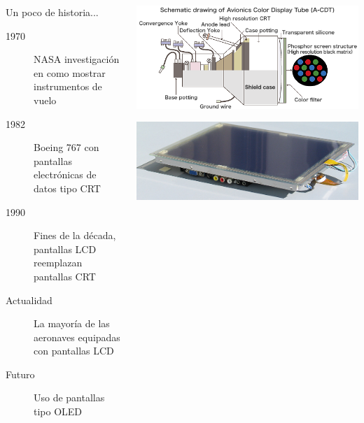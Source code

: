 

\begin{frame}
  \begin{columns}
    \begin{column}{0.5\textwidth}
      \begin{block}{Un poco de historia...}
{\normalsize
        \begin{description}
        \item[1970] NASA investigaci\'on en como mostrar instrumentos
          de vuelo
        \item[1982]Boeing 767 con pantallas electr\'onicas de datos tipo \ac{CRT}
        \item[1990]Fines de la d\'ecada, pantallas \ac{LCD} reemplazan
          pantallas \ac{CRT}
        \item[Actualidad] La mayor\'ia de las aeronaves equipadas con
          pantallas \ac{LCD}
        \item[Futuro] Uso de pantallas tipo \ac{OLED}
        \end{description}
}
      \end{block}
    \end{column}

    \begin{column}{0.5\textwidth}
  \includegraphics[width=0.9\linewidth]{imagenes/1.4.pantalla.electronica/CRT.gif}

\vspace{3mm}

  \includegraphics[width=0.8\linewidth]{imagenes/1.4.pantalla.electronica/LCD.jpg}


\end{column}
\end{columns}
\end{frame}
